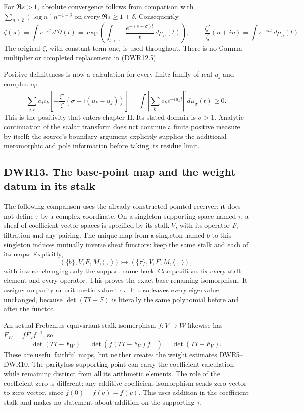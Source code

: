 For \(\Re s>1\), absolute convergence follows from comparison with
\(\sum_{n\ge2}(\log n)n^{-1-\delta}\) on every \(\Re s\ge1+\delta\).
Consequently \[
\zeta(s)=\int e^{-st}\,d\mathcal D(t)
=\exp\left(\int_{t>0}\frac{e^{-(s-\sigma)t}}t\,d\mu_\sigma(t)\right),
\quad
-\frac{\zeta'}{\zeta}(\sigma+iu)=\int e^{-iut}\,d\mu_\sigma(t).
\tag{DWR12.5}
\] The original \(\zeta\), with constant term one, is used throughout.
There is no Gamma multiplier or completed replacement in (DWR12.5).

Positive definiteness is now a calculation for every finite family of
real \(u_j\) and complex \(c_j\): \[
\sum_{j,k}\bar c_jc_k\left[-\frac{\zeta'}\zeta(\sigma+i(u_k-u_j))\right]
=\int\left|\sum_k c_ke^{-iu_kt}\right|^2d\mu_\sigma(t)\ge0.
\tag{DWR12.6}
\] This is the positivity that enters chapter II. Its stated domain is
\(\sigma>1\). Analytic continuation of the scalar transform does not
continue a finite positive measure by itself; the source's boundary
argument explicitly supplies the additional meromorphic and pole
information before taking its residue limit.

\subsection{DWR13. The base-point map and the weight datum in its
stalk}\label{dwr13.-the-base-point-map-and-the-weight-datum-in-its-stalk}

The following comparison uses the already constructed pointed receiver;
it does not define \(\tau\) by a complex coordinate. On a singleton
supporting space named \(\tau\), a sheaf of coefficient vector spaces is
specified by its stalk \(V\), with its operator \(F\), filtration and
any pairing. The unique map from a singleton named \(b\) to this
singleton induces mutually inverse sheaf functors: keep the same stalk
and each of its maps. Explicitly, \[
(\{b\},V,F,M,\langle\ ,\ \rangle)
\longmapsto(\{\tau\},V,F,M,\langle\ ,\ \rangle),
\tag{DWR13.1}
\] with inverse changing only the support name back. Compositions fix
every stalk element and every operator. This proves the exact
base-renaming isomorphism. It assigns no parity or arithmetic value to
\(\tau\). It also leaves every eigenvalue unchanged, because
\(\det(TI-F)\) is literally the same polynomial before and after the
functor.

An actual Frobenius-equivariant stalk isomorphism \(f:V\to W\) likewise
has \(F_W=fF_Vf^{-1}\), so \[
\det(TI-F_W)=\det(f(TI-F_V)f^{-1})=\det(TI-F_V).
\tag{DWR13.2}
\] These are useful faithful maps, but neither creates the weight
estimates DWR5--DWR10. The parityless supporting point can carry the
coefficient calculation while remaining distinct from all its arithmetic
elements. The role of the coefficient zero is different: any additive
coefficient isomorphism sends zero vector to zero vector, since
\(f(0)+f(v)=f(v)\). This uses addition in the coefficient stalk and
makes no statement about addition on the supporting \(\tau\).

